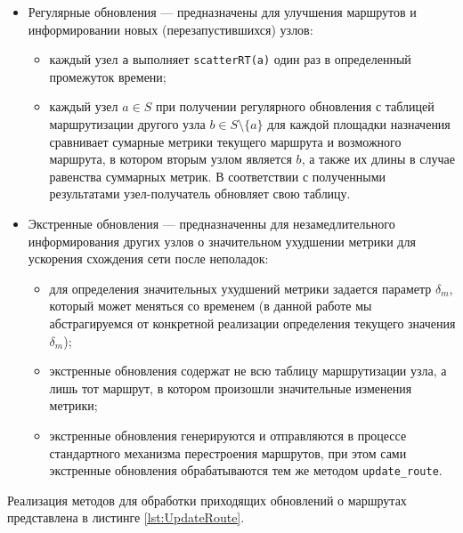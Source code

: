 \documentclass{article}
\theoremstyle{plain}
\theoremstyle{plain}
\theoremstyle{plain}
\theoremstyle{plain}
\theoremstyle{definition}
\theoremstyle{remark}
\theoremstyle{plain}
\begin{document}
\begin{itemize}
    \item Регулярные обновления --- предназначены для улучшения маршрутов и информировании новых (перезапустившихся) узлов:
    
    \begin{itemize}
        \item каждый узел \texttt{a} выполняет \texttt{scatterRT(a)} один раз в определенный промежуток времени;
        
        \item каждый узел $a \in S$ при получении регулярного обновления с таблицей маршрутизации другого узла $b \in S \setminus \{a\}$ для каждой площадки назначения сравнивает сумарные метрики текущего маршрута и возможного маршрута, в котором вторым узлом является $b$, а также их длины в случае равенства суммарных метрик. В соответствии с полученными результатами узел-получатель обновляет свою таблицу.
    \end{itemize}
    
    \item Экстренные обновления --- предназначенны для незамедлительного информирования других узлов о значительном ухудшении метрики для ускорения схождения сети после неполадок:
    
    \begin{itemize}
        \item для определения значительных ухудшений метрики задается параметр $\delta_m$, который может меняться со временем (в данной работе мы абстрагируемся от конкретной реализации определения текущего значения $\delta_m$);
        
        \item экстренные обновления содержат не всю таблицу маршрутизации узла, а лишь тот маршрут, в котором произошли значительные изменения метрики;
        
        \item экстренные обновления генерируются и отправляются в процессе стандартного механизма перестроения маршрутов, при этом сами экстренные обновления обрабатываются тем же методом \texttt{update\_route}.
    \end{itemize}
\end{itemize}

Реализация методов для обработки приходящих обновлений о маршрутах представлена в листинге \ref{lst:UpdateRoute}.
\end{document}
